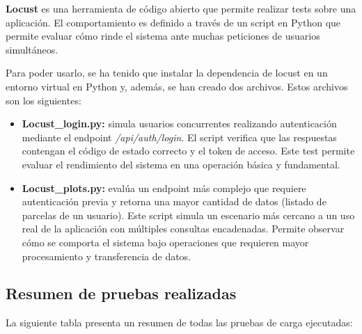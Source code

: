 \textbf{Locust} es una herramienta de código abierto que permite realizar tests sobre una aplicación. El comportamiento es definido a través de un script en Python que
permite evaluar cómo rinde el sistema ante muchas peticiones de usuarios simultáneos.

Para poder usarlo, se ha tenido que instalar la dependencia de locust en un entorno virtual en Python y, además, se han creado dos archivos. Estos archivos son los
siguientes:

\begin{itemize}
    \item \textbf{Locust\_login.py:} simula usuarios concurrentes realizando autenticación mediante el endpoint \textit{/api/auth/login}. El script verifica que las respuestas 
    contengan el código de estado correcto y el token de acceso. Este test permite evaluar el rendimiento del sistema en una operación básica y fundamental.
    
    \item \textbf{Locust\_plots.py:} evalúa un endpoint más complejo que requiere autenticación previa y retorna una mayor cantidad de datos (listado de parcelas de un usuario). 
    Este script simula un escenario más cercano a un uso real de la aplicación con múltiples consultas encadenadas. Permite observar cómo se comporta el sistema bajo operaciones 
    que requieren mayor procesamiento y transferencia de datos.
\end{itemize}

\subsection{Resumen de pruebas realizadas}

La siguiente tabla presenta un resumen de todas las pruebas de carga ejecutadas:

